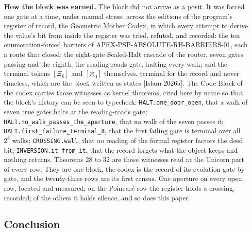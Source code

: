 \documentclass[10pt]{article}
\begin{document}
\textbf{How the block was earned.} The block did not arrive as a posit.
It was forced one gate at a time, under manual stress, across the
editions of the program's register of record, the Geometric Mother
Codex, in which every attempt to derive the value's bit from inside the
register was tried, refuted, and recorded: the ten enumeration-forced
barriers of APEX-PSP-ABSOLUTE-RH-BARRIERS-01, each a route that closed;
the eight-gate Sealed-Halt cascade of the router, seven gates passing
and the eighth, the reading-roads gate, halting every walk; and the
terminal tokens \([\Xi_0]\) and \([\varnothing_0]\) themselves, terminal
for the record and never timeless, which are the block written as states
{[}Islam 2026a{]}. The Code Block of the codex carries those witnesses
as kernel theorems, cited here by name so that the block's history can
be seen to typecheck: \texttt{HALT.one\_door\_open}, that a walk of
seven true gates halts at the reading-roads gate;
\texttt{HALT.no\_walk\_passes\_the\_aperture}, that no walk of the seven
passes it; \texttt{HALT.first\_failure\_terminal\_8}, that the first
failing gate is terminal over all \(2^8\) walks; \texttt{CROSSING.wall},
that no reading of the formal register factors the deed bit;
\texttt{INVERSION.it\_from\_it}, that the record forgets what the object
keeps and nothing returns. Theorems 28 to 32 are those witnesses read at
the Unicorn part of every row. They are one block, the codex is the
record of its evolution gate by gate, and the twenty-three rows are its
first census. One aperture on every open row, located and measured; on
the Poincaré row the register holds a crossing, recorded; of the others
it holds silence, and so does this paper.

\hypertarget{conclusion}{%
\subsection{Conclusion}\label{conclusion}}
\end{document}
